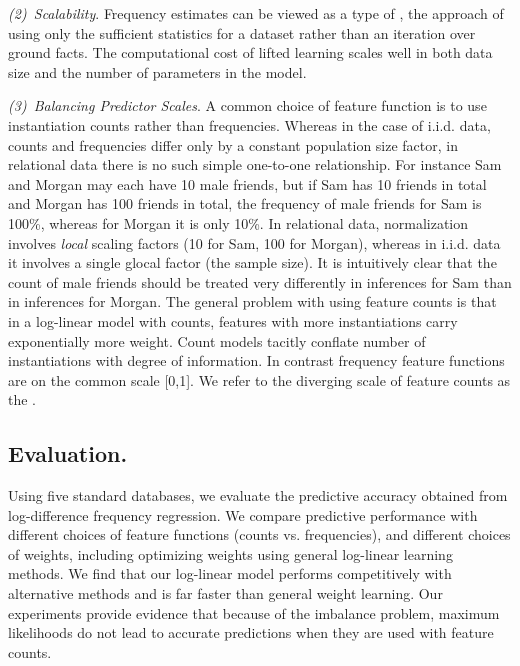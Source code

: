 \documentclass[twoside,11pt]{article}
\newcommand{\point}[1]{\noindent\emph{#1}.}
\newcommand{\iid}{i.i.d.}
\begin{document}
\point{(2)~Scalability} 
Frequency estimates can be viewed as a type of  \cite{Schulte2012}, the approach of using only the sufficient statistics for a dataset rather than an iteration over ground facts. The computational cost of lifted learning scales well in both data size and the number of parameters in the model.


\point{(3)~Balancing Predictor Scales} A common choice of feature function is to use instantiation counts rather than frequencies. 
Whereas in the case of \iid{} data, counts and frequencies differ only by a constant population size factor, in relational data there is no such simple one-to-one relationship. For instance Sam and Morgan may each have 10 male friends, but if Sam has 10 friends in total and Morgan has 100 friends in total, the frequency of male friends for Sam is 100\%, whereas for Morgan it is only 10\%. In relational data, normalization involves {\em local} scaling factors (10 for Sam, 100 for Morgan), whereas in i.i.d. data it involves a single glocal factor (the sample size). It is intuitively clear that the count of male friends should be treated very differently in inferences for Sam than in inferences for Morgan. The general problem with using feature counts is that in a log-linear model with counts, features with more instantiations carry exponentially more weight. Count models tacitly conflate number of instantiations with degree of information.
In contrast frequency feature functions are on the common scale [0,1].
%
We refer to the diverging scale of feature counts as the . 

\subsection{Evaluation.} Using five standard databases, we evaluate the predictive accuracy obtained from log-difference frequency regression. We compare predictive performance with different choices of feature functions (counts vs. frequencies), and different choices of weights, including optimizing weights using general log-linear learning methods. We find that our log-linear model performs competitively with %
alternative methods and is far faster than general weight learning. Our experiments provide evidence that because of the imbalance problem, maximum likelihoods do not lead to accurate predictions when they are used with feature counts.
\end{document}
